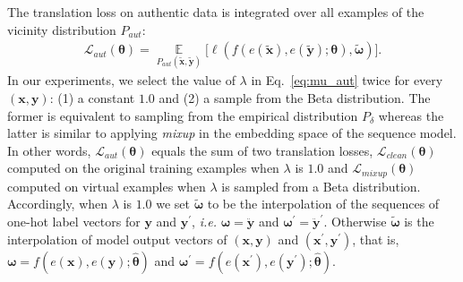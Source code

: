\documentclass[11pt,a4paper]{article}
\def\bx{\mathbf{x}} \def\bxp{\mathbf{x}^{\prime}} \def\bxpp{\mathbf{x}^{\prime\prime}} \def\tbx{\tilde{\mathbf{x}}} \def\hbx{\hat{\mathbf{x}}} \def\ex{e(\mathbf{x})}
\def\tex{e({\tilde{\mathbf{x}}})}
\def\by{\mathbf{y}} \def\byp{\mathbf{y}^{\prime}} \def\bypp{\mathbf{y}^{\prime\prime}} \def\tby{\tilde{\mathbf{y}}} \def\hby{\hat{\mathbf{y}}} \def\ey{e(\mathbf{y})}
\def\tey{e({\tilde{\mathbf{y}}})}
\newcommand{\ie}{\emph{i.e. }} \newcommand{\Ie}{\emph{I.e}}
\newcommand{\mixup}{\textit{mixup}\xspace}
\begin{document}
The translation loss on authentic data is integrated over all examples of the vicinity distribution $P_{aut}$:
\begin{eqnarray}
\mathcal{L}_{aut}(\bm{\theta}) =\!\!\! \mathop{\mathbb{E}}\limits_{P_{aut}{(\tbx,\tby)}} \lbrack \ell(f(\tex, \tey;\bm{\theta}), \tilde{\bm{\omega}}) \rbrack.
\label{eq:loss_aut}
\end{eqnarray}
In our experiments, we select the value of $\lambda$ in Eq.~\eqref{eq:mu_aut} twice for every $(\bx, \by)$: (1) a constant $1.0$ and (2) a sample from the Beta distribution.
The former is equivalent to sampling from the empirical distribution $P_{\delta}$ whereas the latter is similar to applying \mixup in the embedding space of the sequence model. In other words, $\mathcal{L}_{aut}(\bm{\theta})$ equals the sum of two translation losses, $\mathcal{L}_{clean}(\bm{\theta})$ computed on the original training examples when $\lambda$ is $1.0$ and $\mathcal{L}_{mixup}(\bm{\theta})$ computed on virtual examples when $\lambda$ is sampled from a Beta distribution. Accordingly, when  $\lambda$ is $1.0$ we set $\tilde{\bm{\omega}}$ to be the interpolation of the sequences of one-hot label vectors for $\by$ and $\byp$, \ie $\bm{\omega} = \ddot{\by}$ and $\bm{\omega^{\prime}} = \ddot{\mathbf{y}}^{\prime}$.
Otherwise $\tilde{\bm{\omega}}$ is the interpolation of model output vectors of $(\bx, \by)$ and $(\bxp, \byp)$, that is, $\bm{\omega}=f(\ex, \ey;\hat{\bm{\theta}})$ and $\bm{\omega^{\prime}}=f(e(\bxp), e(\byp);\hat{\bm{\theta}})$.
\end{document}
